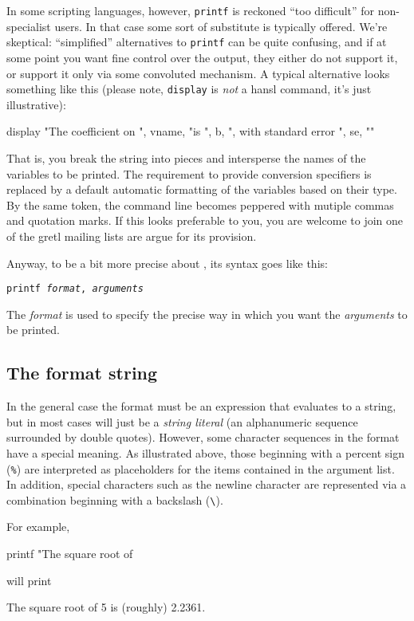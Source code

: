 In some scripting languages, however, \texttt{printf} is reckoned
``too difficult'' for non-specialist users. In that case some sort of
substitute is typically offered. We're skeptical: ``simplified''
alternatives to \texttt{printf} can be quite confusing, and if at some
point you want fine control over the output, they either do not
support it, or support it only via some convoluted mechanism. A
typical alternative looks something like this (please note,
\texttt{display} is \textit{not} a hansl command, it's just
illustrative):
\begin{code}
display "The coefficient on ", vname, "is ", b, ", with standard error ", se, "\n"
\end{code}
That is, you break the string into pieces and intersperse the names of
the variables to be printed. The requirement to provide conversion
specifiers is replaced by a default automatic formatting of the
variables based on their type. By the same token, the command line
becomes peppered with mutiple commas and quotation marks. If this looks
preferable to you, you are welcome to join one of the gretl mailing
lists are argue for its provision.

Anyway, to be a bit more precise about , its syntax goes
like this:
\begin{flushleft}
  \texttt{printf \emph{format}, \emph{arguments}}
\end{flushleft}
The \emph{format} is used to specify the precise way in which you want
the \emph{arguments} to be printed.

\subsection{The format string}
\label{sec:fmtstring}

In the general case the  format must be an expression that
evaluates to a string, but in most cases will just be a \textit{string
  literal} (an alphanumeric sequence surrounded by double
quotes). However, some character sequences in the format have a
special meaning. As illustrated above, those beginning with a
percent sign (\texttt{\%}) are interpreted as placeholders for the
items contained in the argument list. In addition, special characters
such as the newline character are represented via a combination
beginning with a backslash (\verb|\|).

For example,
\begin{code}
printf "The square root of %
\end{code}
will print 
\begin{code}
The square root of 5 is (roughly) 2.2361.
\end{code}

